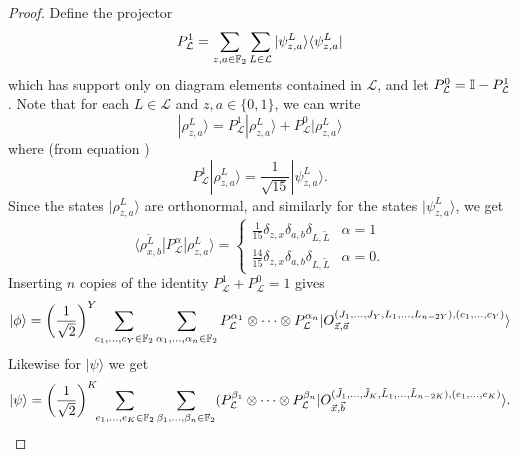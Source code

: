 \documentclass[../thesis-main/thesis-main]{subfiles}
\begin{document}
\begin{proof}
Define the projector 
\begin{equation}
P_{\mathcal{L}}^{1}=\sum_{z,a\in\mathbb{F}_2}\sum_{L\in\mathcal{L}}|\psi_{z,a}^{L}\rangle\langle\psi_{z,a}^{L}|
\end{equation}
which has support only on diagram elements contained in $\mathcal{L}$, and let $P_{\mathcal{L}}^{0}=\mathbb{I}-P_{\mathcal{L}}^{1}$.  Note that for each $L\in\mathcal{L}$ and $z,a\in\{0,1\}$, we can write 
\begin{equation}
|\rho_{z,a}^{L}\rangle=P_{\mathcal{L}}^{1}|\rho_{z,a}^{L}\rangle+P_{\mathcal{L}}^{0}|\rho_{z,a}^{L}\rangle\label{eq:rho_expand}
\end{equation}
where (from equation )
\begin{equation}
P_{\mathcal{L}}^{1}|\rho_{z,a}^{L}\rangle=\frac{1}{\sqrt{15}}|\psi_{z,a}^{L}\rangle.
\end{equation}
Since the states $|\rho_{z,a}^{L}\rangle$ are orthonormal, and similarly for the states $|\psi_{z,a}^{L}\rangle$, we get 
\begin{equation}
\langle\rho_{x,b}^{\tilde{L}}|P_{\mathcal{L}}^{\alpha}|\rho_{z,a}^{L}\rangle=\begin{cases}
\frac{1}{15}\delta_{z,x}\delta_{a,b}\delta_{L,\tilde{L}} & \alpha=1\\
\frac{14}{15}\delta_{z,x}\delta_{a,b}\delta_{L,\tilde{L}} & \alpha=0.
\end{cases}\label{eq:projector_L_rho}
\end{equation}
Inserting $n$ copies of the identity $P_{\mathcal{L}}^{1}+P_{\mathcal{L}}^{0}=1$ gives
\begin{equation}
|\phi\rangle=\left(\frac{1}{\sqrt{2}}\right)^{Y}\!\!\sum_{c_{1},\ldots,c_{Y}\in\mathbb{F}_2}\sum_{\alpha_{1},\ldots,\alpha_{n}\in\mathbb{F}_2}P_{\mathcal{L}}^{\alpha_{1}}
\otimes\cdots\otimes P_{\mathcal{L}}^{\alpha_{n}}|O_{\vec{z},\vec{a}}^{(J_{1},\ldots,J_{Y},L_{1},\ldots,L_{n-2Y}),(c_{1},\ldots,c_{Y})}\rangle\label{eq:phi_sum}
\end{equation}
Likewise for $|\psi\rangle$ we get 
\begin{equation}
|\psi\rangle=\left(\frac{1}{\sqrt{2}}\right)^{K}\!\!\sum_{e_{1},\ldots,e_{K}\in\mathbb{F}_2}\sum_{\beta_{1},\ldots,\beta_{n}\in\mathbb{F}_2}(P_{\mathcal{L}}^{\beta_{1}}
\otimes\cdots\otimes P_{\mathcal{L}}^{\beta_{n}}|O_{\vec{x},\vec{b}}^{(\tilde{J}_{1},\ldots,\tilde{J}_{K},\tilde{L}_{1},\ldots,\tilde{L}_{n-2K}),(e_{1},\ldots,e_{K})}\rangle.\label{eq:psi_sum}
\end{equation}


\end{proof}
\end{document}
